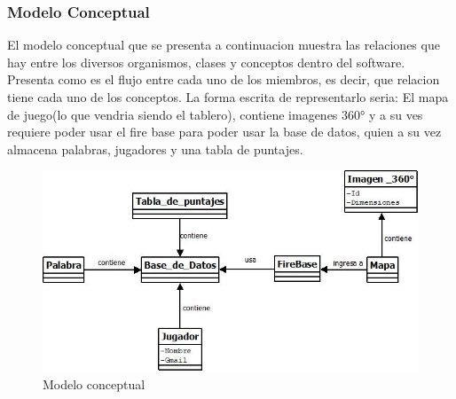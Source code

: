 \subsubsection{Modelo Conceptual}
El modelo conceptual que se presenta a continuacion muestra las relaciones que hay entre los diversos organismos, clases y conceptos dentro del software. Presenta como es el flujo entre cada uno de los miembros, es decir, que relacion tiene cada uno de los conceptos. La forma escrita de representarlo seria:
El mapa de juego(lo que vendria siendo el tablero), contiene imagenes 360° y a su ves requiere poder usar el fire base para poder usar la base de datos, quien a su vez almacena palabras, jugadores y una tabla de puntajes.
\begin{figure}[H]
\centering
   \includegraphics[scale=0.9]{imgs/ModeloConceptual.jpeg}
   \caption{Modelo conceptual}
\end{figure}
\newpage
